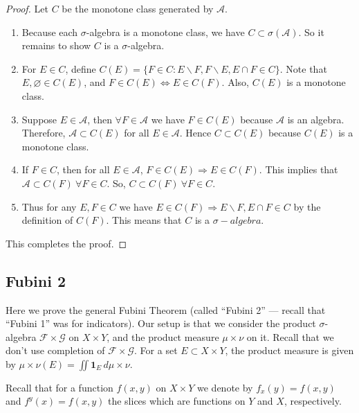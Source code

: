 \documentclass{article}
\theoremstyle{definition}
\begin{document}
\begin{proof}
	Let $C$ be the monotone class generated by $\mathscr{A}$.
	\begin{enumerate}
		\item Because each $\sigma$-algebra is a monotone class, we have
			$C\subset \sigma(\mathscr{A})$. So it remains to show $C$ is a $\sigma$-algebra.
		\item For $E\in C$, define $C(E)=\{F\in C: E\backslash F,F\backslash E, E\cap F\in C\}$.
			Note that $E, \varnothing \in C(E)$, and $F\in C(E) \Leftrightarrow E\in C(F)$.
			Also, $C(E)$ is a monotone class.
		\item  Suppose $E\in \mathscr{A}$, then $\forall F\in \mathscr{A}$ we have $F\in C(E)$
			because $\mathscr{A}$ is an algebra.
			Therefore, 
			$\mathscr{A}\subset C(E)$ 
			for all $E\in \mathscr{A}$.
			Hence $C\subset C(E)$ because $C(E)$ is a monotone class.
		\item If $F\in C$, then for all $E\in \mathscr{A}$, $F\in C(E) \Rightarrow E\in C(F)$.
			This implies that 
			$\mathscr{A} \subset C(F) \ \forall F\in C$. So,  $C\subset C(F) \ \forall F\in C$.
		\item Thus for any $E,F\in C$ we have $E\in C(F) \Rightarrow E\backslash F, E\cap F \in C$ by 
			the definition of $C(F)$. This means that  $C$ is a $\sigma-algebra$.
	\end{enumerate}
	This completes the proof.
\end{proof}

\subsection{Fubini 2}

Here we prove the general Fubini Theorem (called ``Fubini 2'' --- recall that ``Fubini 1'' was for
indicators). Our setup is that we consider the product $\sigma$-algebra 
$\mathscr{F}\times \mathscr{G}$ on $X\times Y$, and the product
measure $\mu\times \nu$ on it. Recall that we don't use completion of
$\mathscr{F}\times \mathscr{G}$.
For a set $E\subset X\times Y$,
the product measure is given by $\mu \times \nu (E) = \iint  \mathbf{1}_{E}\, d\mu\times\nu$.

Recall that for a function $f(x,y)$ on $X\times Y$ we denote by 
$f_x(y)=f(x,y)$ and $f^y(x)=f(x,y)$ the slices
which are functions on $Y$ and $X$, respectively.
\end{document}

